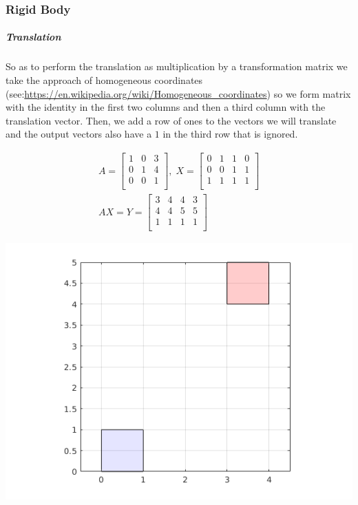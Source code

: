 \documentclass[MathsNotesBase.tex]{subfiles}
\begin{document}
{		\subsubsection{Rigid Body}
		\subparagraph{Translation}
		So as to perform the translation as multiplication by a transformation matrix we take the approach of homogeneous coordinates (see:\url{https://en.wikipedia.org/wiki/Homogeneous_coordinates}) so we form matrix with the identity in the first two columns and then a third column with the translation vector. Then, we add a row of ones to the vectors we will translate and the output vectors also have a $1$ in the third row that is ignored.
		
		\begin{align*}
		A =
		\begin{bmatrix}    
		1 & 0  & 3 \\
		0 & 1  & 4 \\
		0 & 0  & 1 \\		
		\end{bmatrix}
		,\; X = 
		\begin{bmatrix}  
		0   &  1  &   1  &   0 \\
		0   &  0  &   1  &   1	\\	
		1   &  1  &   1  &   1	\\	
		\end{bmatrix} \\[10pt]
		AX = Y = 
		\begin{bmatrix}   
		3  &   4  &   4  &   3 \\
		4  &   4  &   5  &   5	\\
		1   &  1  &   1  &   1	\\
		\end{bmatrix}
		\end{align*}
		
		\begin{center}
		\includegraphics[scale=0.85]{resources/img/GeometryOfMatrices_images/translation.png}
		\end{center}
		
}
\end{document}
